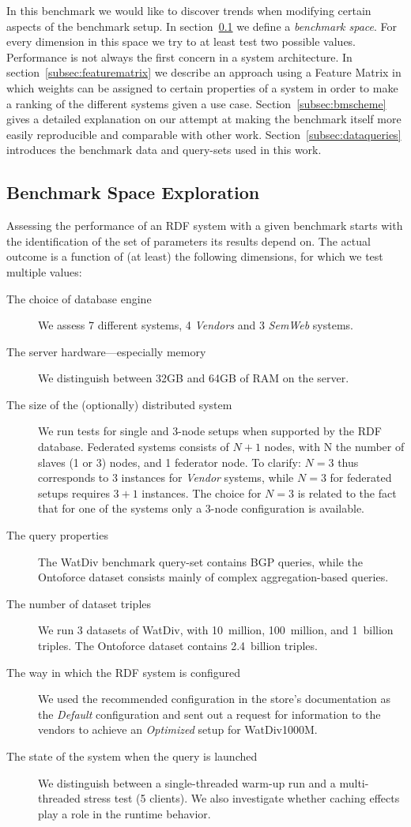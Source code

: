 In this benchmark we would like to discover trends when modifying certain aspects of the benchmark setup. In section~\ref{subsec:bmexplore} we define a \emph{benchmark space}. For every dimension in this space we try to at least test two possible values.
Performance is not always the first concern in a system architecture. In section~\ref{subsec:featurematrix} we describe an approach using a Feature Matrix in which weights can be assigned to certain properties of a system in order to make a ranking of the different systems given a use case. Section~\ref{subsec:bmscheme} gives a detailed explanation on our attempt at making the benchmark itself more easily reproducible and comparable with other work. Section~\ref{subsec:dataqueries} introduces the benchmark data and query-sets used in this work. 

\subsection{Benchmark Space Exploration}
\label{subsec:bmexplore}
Assessing the performance of an RDF system with a given benchmark starts with the identification of the set of parameters its results depend on. 
The actual outcome is a function of (at least) the following dimensions, for which we test multiple values:
\begin{description}
	\item[The choice of database engine] We assess 7 different systems, 4 \emph{Vendors} and 3 \emph{SemWeb} systems.
	\item[The server hardware---especially memory] We distinguish between 32GB and 64GB of RAM on the server.
	\item[The size of the (optionally) distributed system] We run tests for single and 3-node setups when supported by the RDF database. Federated systems consists of $N+1$ nodes, with N the number of slaves (1 or 3) nodes, and 1 federator node. To clarify: $N=3$ thus corresponds to 3 instances for \emph{Vendor} systems, while $N=3$ for federated setups requires $3+1$ instances. The choice for $N=3$ is related to the fact that for one of the systems only a 3-node configuration is available.
	\item[The query properties] The WatDiv benchmark query-set contains BGP queries, while the Ontoforce dataset consists mainly of complex aggregation-based queries.
	\item[The number of dataset triples] We run 3 datasets of WatDiv, with 10~million, 100~million, and 1~billion triples. The Ontoforce dataset contains 2.4~billion triples.
	\item[The way in which the RDF system is configured] We used the recommended configuration in the store's documentation as the \emph{Default} configuration and sent out a request for information to the vendors to achieve an \emph{Optimized} setup for WatDiv1000M.
	\item[The state of the system when the query is launched] We distinguish between a single-threaded warm-up run and a multi-threaded stress test (5 clients). We also investigate whether caching effects play a role in the runtime behavior.
\end{description}

